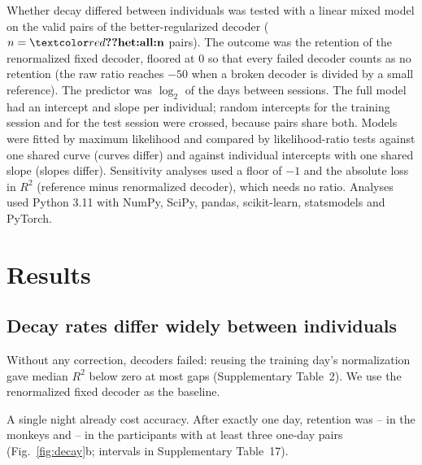 \documentclass{iopjournal}
\begin{document}
Whether decay differed between individuals was tested with a linear mixed model on the valid pairs of the
better-regularized decoder ($n = \val{het:all:n}$ pairs). The outcome was the retention of the renormalized fixed decoder,
floored at 0 so that every failed decoder counts as no retention (the raw ratio reaches $-50$ when a broken decoder is
divided by a small reference). The predictor was $\log_2$ of the days between sessions. The full model had an intercept
and slope per individual; random intercepts for the training session and for the test session were crossed, because
pairs share both. Models were fitted by maximum likelihood and compared by likelihood-ratio tests against one shared
curve (curves differ) and against individual intercepts with one shared slope (slopes differ). Sensitivity analyses used
a floor of $-1$ and the absolute loss in $R^2$ (reference minus renormalized decoder), which needs no ratio. Analyses
used Python 3.11 with NumPy, SciPy, pandas, scikit-learn, statsmodels and PyTorch.

\section{Results}
\subsection{Decay rates differ widely between individuals}

Without any correction, decoders failed: reusing the training day's normalization gave median $R^2$ below zero at most
gaps (Supplementary Table~2). We use the renormalized fixed decoder as the baseline.

A single night already cost accuracy. After exactly one day, retention was -- in the
monkeys and -- in the  participants with at least three
one-day pairs
(Fig.~\ref{fig:decay}b; intervals in Supplementary Table~17).
\end{document}
